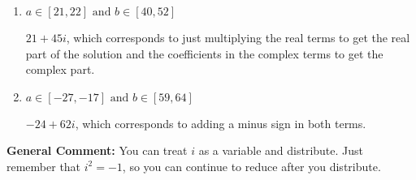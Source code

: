 \documentclass{extbook}[14pt]
\begin{document}
\begin{enumerate}
{\begin{enumerate}[label=\Alph*.]
 $66 - 8 i$, which corresponds to adding a minus sign in the first term.
\item \( a \in [21, 22] \text{ and } b \in [40, 52] \)

 $21 + 45 i$, which corresponds to just multiplying the real terms to get the real part of the solution and the coefficients in the complex terms to get the complex part.
\item \( a \in [-27, -17] \text{ and } b \in [59, 64] \)

 $-24 + 62 i$, which corresponds to adding a minus sign in both terms.
\end{enumerate}

\textbf{General Comment:} You can treat $i$ as a variable and distribute. Just remember that $i^2=-1$, so you can continue to reduce after you distribute.
}
\end{enumerate}
\end{document}
